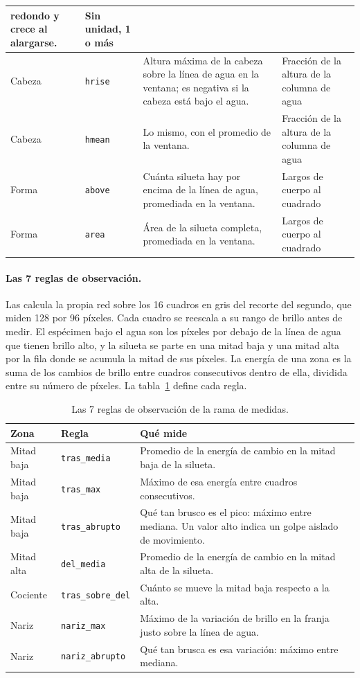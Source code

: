 \begin{longtable}{|p{1.7cm}|p{1.6cm}|p{6.6cm}|p{3.4cm}|}
redondo y crece al alargarse. & Sin unidad, 1 o más \\
\hline
Cabeza & \texttt{hrise} & Altura máxima de la cabeza sobre la línea de agua en la ventana; es negativa si la cabeza
está bajo el agua. & Fracción de la altura de la columna de agua \\
\hline
Cabeza & \texttt{hmean} & Lo mismo, con el promedio de la ventana. & Fracción de la altura de la columna de agua \\
\hline
Forma & \texttt{above} & Cuánta silueta hay por encima de la línea de agua, promediada en la ventana. & Largos de
cuerpo al cuadrado \\
\hline
Forma & \texttt{area} & Área de la silueta completa, promediada en la ventana. & Largos de cuerpo al cuadrado \\
\hline
\end{longtable}

\paragraph{Las 7 reglas de observación.} Las calcula la propia red sobre los 16 cuadros en gris del recorte del
segundo, que miden 128 por 96 píxeles. Cada cuadro se reescala a su rango de brillo antes de medir. El espécimen bajo
el agua son los píxeles por debajo de la línea de agua que tienen brillo alto, y la silueta se parte en una mitad baja y
una mitad alta por la fila donde se acumula la mitad de sus píxeles. La energía de una zona es la suma de los cambios de
brillo entre cuadros consecutivos dentro de ella, dividida entre su número de píxeles. La
tabla~\ref{tab:reglas_red} define cada regla.

\begin{table}[H]
\centering
\caption{Las 7 reglas de observación de la rama de medidas.}
\label{tab:reglas_red}
\begin{tabular}{|p{2.0cm}|p{2.6cm}|p{8.5cm}|}
\hline
\textbf{Zona} & \textbf{Regla} & \textbf{Qué mide} \\
\hline
Mitad baja & \texttt{tras\_media} & Promedio de la energía de cambio en la mitad baja de la silueta. \\
\hline
Mitad baja & \texttt{tras\_max} & Máximo de esa energía entre cuadros consecutivos. \\
\hline
Mitad baja & \texttt{tras\_abrupto} & Qué tan brusco es el pico: máximo entre mediana. Un valor alto indica un golpe
aislado de movimiento. \\
\hline
Mitad alta & \texttt{del\_media} & Promedio de la energía de cambio en la mitad alta de la silueta. \\
\hline
Cociente & \texttt{tras\_sobre\_del} & Cuánto se mueve la mitad baja respecto a la alta. \\
\hline
Nariz & \texttt{nariz\_max} & Máximo de la variación de brillo en la franja justo sobre la línea de agua. \\
\hline
Nariz & \texttt{nariz\_abrupto} & Qué tan brusca es esa variación: máximo entre mediana. \\
\hline
\end{tabular}
\end{table}

